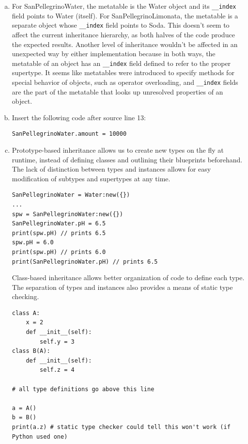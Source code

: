 \documentclass[11pt]{article}
\begin{document}
\begin{enumerate}[(a)]
\item For SanPellegrinoWater, the metatable is the Water object and its \texttt{\_\_index} field points to Water (itself). For SanPellegrinoLimonata, the metatable is a separate object whose \texttt{\_\_index} field points to Soda. This doesn't seem to affect the current inheritance hierarchy, as both halves of the code produce the expected results. Another level of inheritance wouldn't be affected in an unexpected way by either implementation because in both ways, the metatable of an object has an \texttt{\_\_index} field defined to refer to the proper supertype. It seems like metatables were introduced to specify methods for special behavior of objects, such as operator overloading, and \texttt{\_\_index} fields are the part of the metatable that looks up unresolved properties of an object.
\item Insert the following code after source line 13: \begin{verbatim}
SanPellegrinoWater.amount = 10000
\end{verbatim}
\newpage
\item Prototype-based inheritance allows us to create new types on the fly at runtime, instead of defining classes and outlining their blueprints beforehand. The lack of distinction between types and instances allows for easy modification of subtypes and supertypes at any time. \begin{verbatim}
SanPellegrinoWater = Water:new({})
...
spw = SanPellegrinoWater:new({})
SanPellegrinoWater.pH = 6.5
print(spw.pH) // prints 6.5
spw.pH = 6.0
print(spw.pH) // prints 6.0
print(SanPellegrinoWater.pH) // prints 6.5
\end{verbatim}
Class-based inheritance allows better organization of code to define each type. The separation of types and instances also provides a means of static type checking. \begin{verbatim}
class A:
    x = 2
    def __init__(self):
        self.y = 3
class B(A):
    def __init__(self):
        self.z = 4

# all type definitions go above this line

a = A()
b = B()
print(a.z) # static type checker could tell this won't work (if Python used one)
\end{verbatim}
\end{enumerate}


\newpage
\end{document}
